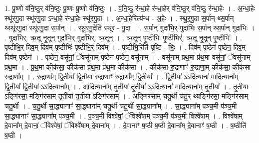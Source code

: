 \documentclass[17pt]{extarticle}
\begin{document}
1. पू॒ष्णो व॑नि॒ष्ठुर् व॑नि॒ष्ठुः पू॒ष्णः पू॒ष्णो व॑नि॒ष्ठुः । . व॒नि॒ष्ठु र॑न्धा॒हे र॑न्धा॒हेर् व॑नि॒ष्ठुर् व॑नि॒ष्ठु र॑न्धा॒हेः । . अ॒न्धा॒हेः स्थू॑रगु॒दा स्थू॑रगु॒दा ऽन्धा॒हे र॑न्धा॒हेः स्थू॑रगु॒दा । . अ॒न्धा॒हेरित्य॑न्ध - अ॒हेः । . स्थू॒र॒गु॒दा स॒र्पान् थ्स॒र्पान् थ्स्थू॑रगु॒दा स्थू॑रगु॒दा स॒र्पान् । . स्थू॒र॒गु॒देति॑ स्थूर - गु॒दा । . स॒र्पान् गुदा॑भि॒र् गुदा॑भिः स॒र्पान् थ्स॒र्पान् गुदा॑भिः । . गुदा॑भिर्. ऋ॒तू नृ॒तून् गुदा॑भि॒र् गुदा॑भिर्. ऋ॒तून् । . ऋ॒तून् पृ॒ष्टीभिः॑ पृ॒ष्टीभिर्॑. ऋ॒तू नृ॒तून् पृ॒ष्टीभिः॑ । . पृ॒ष्टीभि॒र् दिव॒म् दिव॑म् पृ॒ष्टीभिः॑ पृ॒ष्टीभि॒र् दिव᳚म् । . पृ॒ष्टीभि॒रिति॑ पृ॒ष्टि - भिः॒ । . दिव॑म् पृ॒ष्ठेन॑ पृ॒ष्ठेन॒ दिव॒म् दिव॑म् पृ॒ष्ठेन॑ । . पृ॒ष्ठेन॒ वसू॑नां॒ ॅवसू॑नाम् पृ॒ष्ठेन॑ पृ॒ष्ठेन॒ वसू॑नाम् । . वसू॑नाम् प्रथ॒मा प्र॑थ॒मा वसू॑नां॒ ॅवसू॑नाम् प्रथ॒मा । . प्र॒थ॒मा कीक॑सा॒ कीक॑सा प्रथ॒मा प्र॑थ॒मा कीक॑सा । . कीक॑सा रु॒द्राणाꣳ॑ रु॒द्राणा॒म् कीक॑सा॒ कीक॑सा रु॒द्राणा᳚म् । . रु॒द्राणा᳚म् द्वि॒तीया᳚ द्वि॒तीया॑ रु॒द्राणाꣳ॑ रु॒द्राणा᳚म् द्वि॒तीया᳚ । . द्वि॒तीया॑ ऽऽदि॒त्याना॑ मादि॒त्याना᳚म् द्वि॒तीया᳚ द्वि॒तीया॑ ऽऽदि॒त्याना᳚म् । . आ॒दि॒त्याना᳚म् तृ॒तीया॑ तृ॒तीया॑ ऽऽदि॒त्याना॑ मादि॒त्याना᳚म् तृ॒तीया᳚ । . तृ॒तीया ऽङ्गि॑रसा॒ मङ्गि॑रसाम् तृ॒तीया॑ तृ॒तीया ऽङ्गि॑रसाम् । . अङ्गि॑रसाम् चतु॒र्थी च॑तु॒र् थ्यङ्गि॑रसा॒ मङ्गि॑रसाम् चतु॒र्थी । . च॒तु॒र्थी सा॒द्ध्यानाꣳ॑ सा॒द्ध्याना᳚म् चतु॒र्थी च॑तु॒र्थी सा॒द्ध्याना᳚म् । . सा॒द्ध्याना᳚म् पञ्च॒मी प॑ञ्च॒मी सा॒द्ध्यानाꣳ॑ सा॒द्ध्याना᳚म् पञ्च॒मी । . प॒ञ्च॒मी विश्वे॑षां॒ ॅविश्वे॑षाम् पञ्च॒मी प॑ञ्च॒मी विश्वे॑षाम् । . विश्वे॑षाम् दे॒वाना᳚म् दे॒वानां॒ ॅविश्वे॑षां॒ ॅविश्वे॑षाम् दे॒वाना᳚म् । . दे॒वानाꣳ॑ ष॒ष्ठी ष॒ष्ठी दे॒वाना᳚म् दे॒वानाꣳ॑ ष॒ष्ठी । . ष॒ष्ठीति॑ ष॒ष्ठी । \newline
\end{document}

